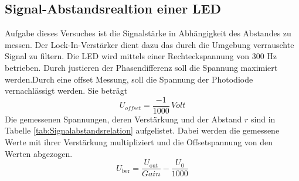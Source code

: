 \subsection{Signal-Abstandsrealtion einer LED}
Aufgabe dieses Versuches ist die Signalstärke in Abhängigkeit des Abstandes zu messen. Der Lock-In-Verstärker dient dazu das durch die Umgebung verrauschte Signal zu filtern. Die LED wird mittels einer Rechteckspannung von 300 Hz betrieben. Durch justieren der Phasendifferenz soll die Spannung maximiert werden.Durch eine offset Messung, soll die Spannung der Photodiode vernachlässigt werden. Sie beträgt 
\begin{equation}
  U_{offset}= \frac{-1}{1000} \, Volt
  \label{Uoffset}
\end{equation}
Die gemessenen Spannungen, deren Verstärkung und der Abstand $r$ sind in Tabelle \ref{tab:Signalabstandsrelation} aufgelistet. Dabei werden die gemessene Werte mit ihrer Verstärkung multipliziert und  die Offsetspannung von den Werten abgezogen.
\begin{equation}
  U_{\text{ber}} = \frac{U_{\text{out}}}{Gain} - \frac{U_{0}}{1000}
  \label{Uber}
\end{equation}

